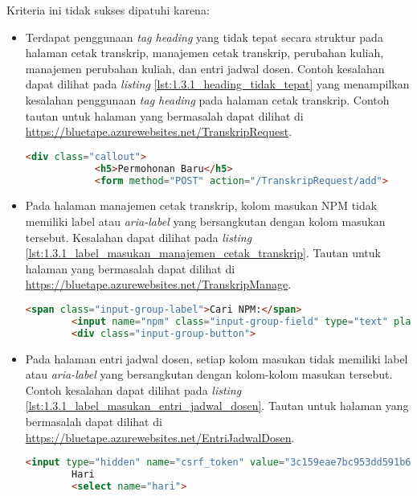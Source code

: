 Kriteria ini tidak sukses dipatuhi karena:
\begin{itemize}
    \item Terdapat penggunaan \textit{tag heading} yang tidak tepat secara struktur pada halaman cetak transkrip, manajemen cetak transkrip, perubahan kuliah, manajemen perubahan kuliah, dan entri jadwal dosen. Contoh kesalahan dapat dilihat pada \textit{listing} \ref{lst:1.3.1_heading_tidak_tepat} yang menampilkan kesalahan penggunaan \textit{tag heading} pada halaman cetak transkrip. Contoh tautan untuk halaman yang bermasalah dapat dilihat di \url{https://bluetape.azurewebsites.net/TranskripRequest}.
    \begin{lstlisting}[frame=single, label={lst:1.3.1_heading_tidak_tepat}, language=HTML, caption=Pelanggaran Kriteria Sukses 1.3.1 pada Halaman Cetak Transkrip]
        <div class="callout">
            <h5>Permohonan Baru</h5>
            <form method="POST" action="/TranskripRequest/add">
    \end{lstlisting}

    \item Pada halaman manajemen cetak transkrip, kolom masukan NPM tidak memiliki label atau \textit{aria-label} yang bersangkutan dengan kolom masukan tersebut. Kesalahan dapat dilihat pada \textit{listing} \ref{lst:1.3.1_label_masukan_manajemen_cetak_transkrip}. Tautan untuk halaman yang bermasalah dapat dilihat di \url{https://bluetape.azurewebsites.net/TranskripManage}.
    \begin{lstlisting}[frame=single, label={lst:1.3.1_label_masukan_manajemen_cetak_transkrip}, language=HTML, caption=Pelanggaran Kriteria Sukses 1.3.1 pada Halaman Manajemen Cetak Transkrip]
        <span class="input-group-label">Cari NPM:</span>
        <input name="npm" class="input-group-field" type="text" placeholder="2013730013" maxlength="10" minlength="10"/>
        <div class="input-group-button">
    \end{lstlisting}

    \item Pada halaman entri jadwal dosen, setiap kolom masukan tidak memiliki label atau \textit{aria-label} yang bersangkutan dengan kolom-kolom masukan tersebut. Contoh kesalahan dapat dilihat pada \textit{listing} \ref{lst:1.3.1_label_masukan_entri_jadwal_dosen}. Tautan untuk halaman yang bermasalah dapat dilihat di \url{https://bluetape.azurewebsites.net/EntriJadwalDosen}.
    \begin{lstlisting}[frame=single, label={lst:1.3.1_label_masukan_entri_jadwal_dosen}, language=HTML, caption=Pelanggaran Kriteria Sukses 1.3.1 pada Halaman Entri Jadwal Dosen]
        <input type="hidden" name="csrf_token" value="3c159eae7bc953dd591b679c080ed066"/>
        Hari
        <select name="hari">
    \end{lstlisting}
\end{itemize} 

